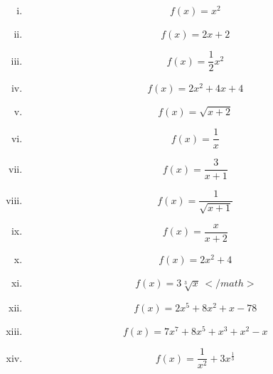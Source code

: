 \documentclass[]{article}
\title{}
\author{}
\begin{document}
\maketitle

\begin{abstract}

\end{abstract}

\section{}


\begin{enumerate}[(i)]
\item		 \[ f(x) = x^2 \,\] %
\item		 \[ f(x) = 2x + 2 \,\] %
\item		 \[ f(x) = \frac{1}{2}x^2 \,\] %
\item		 \[ f(x) = 2x^2 + 4x + 4 \,\] %
\item		 \[ f(x) = \sqrt{x+2} \,\] %
\item		 \[ f(x) = \frac{1}{x} \,\] %
\item		 \[ f(x) = \frac{3}{x+1} \,\] %
\item		 \[ f(x) = \frac{1}{\sqrt{x+1}} \,\] %
\item		 \[ f(x) = \frac{x}{x+2} \,\] %
\item		 \[ f(x) = 2x^2 + 4\,\] %
\item		 \[ f(x) = 3\sqrt[3]{x}\,</math> \]
\item		 \[ f(x) = 2x^5+8x^2+x-78\,\] %
\item		 \[ f(x) = 7x^7+8x^5+x^3+x^2-x\,\] %
\item		\[ f(x) = \frac{1}{x^2}+3x^\frac{1}{3}\,\] %


\end{enumerate}
\end{document}
